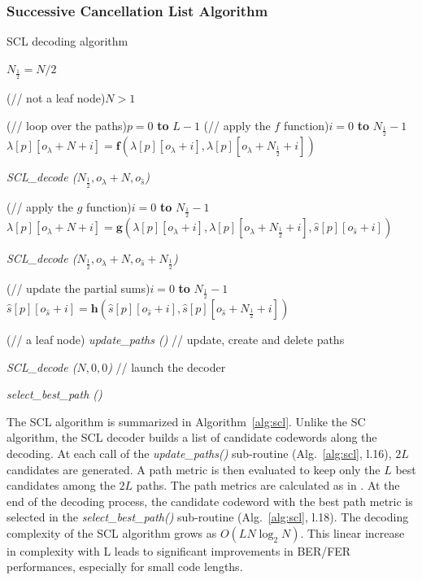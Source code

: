 \subsubsection{Successive Cancellation List Algorithm}

\begin{algorithm}
  \caption{SCL decoding algorithm}\label{alg:scl}

  \small


  {
    $N_{\frac{1}{2}} = N / 2$

    \uIf(// not a leaf node){$N > 1$}
    {
      \For(// loop over the paths){$p=0$ \textbf{to} $L-1$}
      {
        \For(// apply the $f$ function){$i=0$ \textbf{to} $N_{\frac{1}{2}}-1$}
        {
          $\lambda[p][o_\lambda + N + i] = \bm{f}(\lambda[p][o_\lambda + i], \lambda[p][o_\lambda + N_{\frac{1}{2}} + i])$
        }
      }

      \textit{SCL\_decode ($N_{\frac{1}{2}}, o_{\lambda} + N, o_{\hat{s}}$)}

      {
        \For(// apply the $g$ function){$i=0$ \textbf{to} $N_{\frac{1}{2}}-1$}
        {
          $\lambda[p][o_\lambda + N + i] = \bm{g}(\lambda[p][o_\lambda + i], \lambda[p][o_\lambda + N_{\frac{1}{2}} + i], \hat{s}[p][o_{\hat{s}} + i])$
        }
      }

      \textit{SCL\_decode ($N_{\frac{1}{2}}, o_{\lambda} + N, o_{\hat{s}} + N_{\frac{1}{2}}$)}

      {
        \For(// update the partial sums){$i=0$ \textbf{to} $N_{\frac{1}{2}}-1$}
        {
          $\hat{s}[p][o_{\hat{s}} + i] = \bm{h}(\hat{s}[p][o_{\hat{s}} + i], \hat{s}[p][o_{\hat{s}} + N_{\frac{1}{2}} + i])$
        }
      }
    }
    \Else(// a leaf node)
    {
      \textit{update\_paths ()} // update, create and delete paths
    }
  }

  \textit{SCL\_decode ($N, 0, 0$)} // launch the decoder

  \textit{select\_best\_path ()}
\end{algorithm}

The SCL algorithm is summarized in Algorithm~\ref{alg:scl}. Unlike the SC
algorithm, the SCL decoder builds a list of candidate codewords along the
decoding. At each call of the \textit{update\_paths()} sub-routine
(Alg.~\ref{alg:scl}, l.16), $2L$ candidates are generated. A path metric is then
evaluated to keep only the $L$ best candidates among the $2L$ paths. The path
metrics are calculated as in \cite{Balatsoukas-Stimming2015}. At the end of the
decoding process, the candidate codeword with the best path metric is selected
in the \textit{select\_best\_path()} sub-routine (Alg.~\ref{alg:scl}, l.18).
The decoding complexity of the SCL algorithm grows as $O(LN\log_2N)$. This
linear increase in complexity with L leads to significant improvements in
BER/FER performances, especially for small code lengths.

